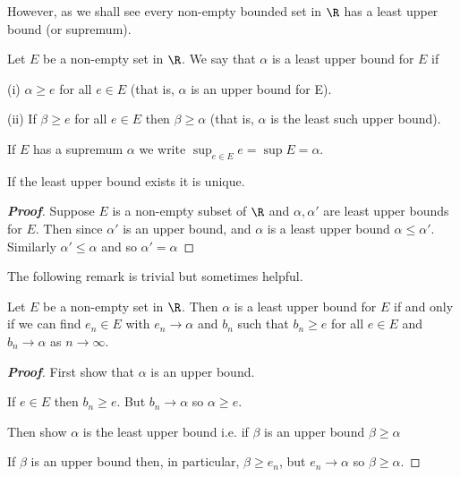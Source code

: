 However, as we shall see every non-empty bounded set in $\R$ has a least upper bound (or supremum).

\begin{definition}[supremum]\label{def:supremum_real}
Let $E$ be a non-empty set in $\R$. We say that $\alpha$ is a least upper bound for $E$ if
\ben
\item [(i)] $\alpha \geq e$ for all $e \in E$ (that is, $\alpha$ is an upper bound for E).
\item [(ii)] If $\beta \geq e$ for all $e \in E$ then $\beta \geq \alpha$ (that is, $\alpha$ is the least such upper bound).
\een

If $E$ has a supremum $\alpha$ we write $\sup_{e \in E} e= \sup E = \alpha$.
\end{definition}


\begin{lemma}\label{lem:supremum_real_uniqueness}
If the least upper bound exists it is unique.
\end{lemma}

\begin{proof}[\bf Proof]
Suppose $E$ is a non-empty subset of $\R$ and $\alpha, \alpha'$ are least upper bounds for $E$. Then since $\alpha'$ is an upper bound, and $\alpha$ is a least upper bound $\alpha \leq \alpha'$. Similarly $\alpha' \leq \alpha$ and so $\alpha' = \alpha$
\end{proof}

The following remark is trivial but sometimes helpful.

\begin{lemma}\label{lem:supremum_real_existence}
Let $E$ be a non-empty set in $\R$. Then $\alpha$ is a least upper bound for $E$ if and only if we can find $e_n \in E$ with $e_n \rightarrow \alpha$ and $b_n$ such that $b_n \geq e$ for all $e \in E$ and $b_n \to \alpha$ as $n \to \infty$.
\end{lemma}

\begin{proof}[\bf Proof]
First show that $\alpha$ is an upper bound.

If $e \in E$ then $b_n \geq e$. But $b_n \to \alpha$ so $\alpha \geq e$.

Then show $\alpha$ is the least upper bound i.e. if $\beta$ is an upper bound $\beta \geq \alpha$

If $\beta$ is an upper bound then, in particular, $\beta \geq e_n$, but $e_n \to \alpha$ so $\beta \geq \alpha$.
\end{proof}



